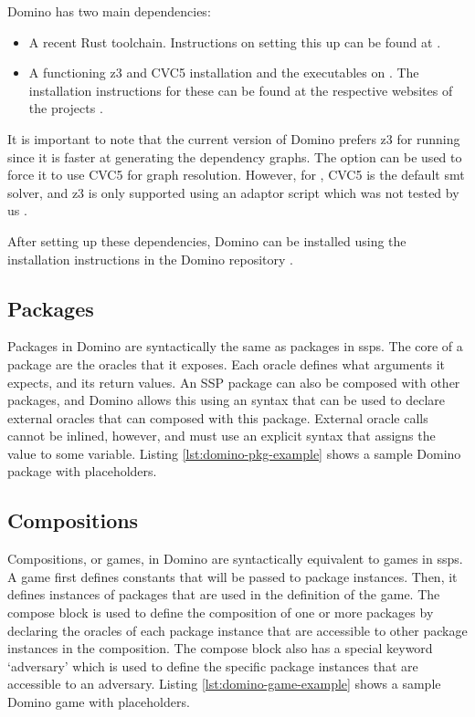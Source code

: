Domino has two main dependencies:
\begin{itemize}
    \item A recent Rust toolchain. Instructions on setting this up can be found at \cite{rust_install}.
    \item A functioning \acrshort{z3} and CVC5 installation and the executables on . The installation instructions for these can be found at the respective websites of the projects \cite{cvc5_install,z3_install}.
\end{itemize} 
It is important to note that the current version of Domino prefers \acrshort{z3} for running  since it is faster at generating the dependency graphs. The  option can be used to force it to use CVC5 for graph resolution. However, for , CVC5 is the default \acrshort{smt} solver, and \acrshort{z3} is only supported using an adaptor script which was not tested by us \cite{domino:paper}.

After setting up these dependencies, Domino can be installed using the installation instructions in the Domino repository \cite{domino:code}.

\subsection{Packages}
\label{subsec:arch_packages}
Packages in Domino are syntactically the same as packages in \acrshort{ssp}s. The core of a package are the oracles that it exposes. Each oracle defines what arguments it expects, and its return values. An SSP package can also be composed with other packages, and Domino allows this using an  syntax that can be used to declare external oracles that can composed with this package. External oracle calls cannot be inlined, however, and must use an explicit  syntax that assigns the value to some variable. Listing \ref{lst:domino-pkg-example} shows a sample Domino package with placeholders.



\subsection{Compositions}
\label{subsec:arch_compositions}
Compositions, or games, in Domino are syntactically equivalent to games in \acrshort{ssp}s. A game first defines constants that will be passed to package instances. Then, it defines instances of packages that are used in the definition of the game. The compose block is used to define the composition of one or more packages by declaring the oracles of each package instance that are accessible to other package instances in the composition. The compose block also has a special keyword `adversary' which is used to define the specific package instances that are accessible to an adversary. Listing \ref{lst:domino-game-example} shows a sample Domino game with placeholders.

